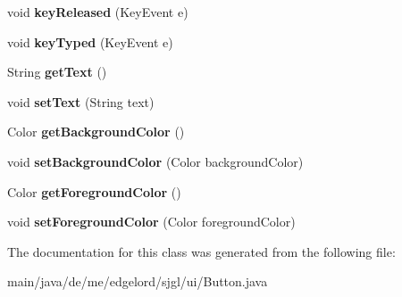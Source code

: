 \begin{DoxyCompactItemize}
void {\bfseries key\+Released} (Key\+Event e)
\item 
\mbox{\label{classde_1_1me_1_1edgelord_1_1sjgl_1_1ui_1_1_button_ac9965b45f8108c46ddbdcd4b589bb721}} 
void {\bfseries key\+Typed} (Key\+Event e)
\item 
\mbox{\label{classde_1_1me_1_1edgelord_1_1sjgl_1_1ui_1_1_button_a10a2c442e7f4094461adaa4562f98f4a}} 
String {\bfseries get\+Text} ()
\item 
\mbox{\label{classde_1_1me_1_1edgelord_1_1sjgl_1_1ui_1_1_button_ac6f97a139bb49795003a6f8e9e6f7339}} 
void {\bfseries set\+Text} (String text)
\item 
\mbox{\label{classde_1_1me_1_1edgelord_1_1sjgl_1_1ui_1_1_button_a5ba9974781cf8924054d457b68659f5a}} 
Color {\bfseries get\+Background\+Color} ()
\item 
\mbox{\label{classde_1_1me_1_1edgelord_1_1sjgl_1_1ui_1_1_button_a8d460ed5fb8c17ac91fddaf1aeb60042}} 
void {\bfseries set\+Background\+Color} (Color background\+Color)
\item 
\mbox{\label{classde_1_1me_1_1edgelord_1_1sjgl_1_1ui_1_1_button_a8aa9dbe9168ae185078fc819bb048d60}} 
Color {\bfseries get\+Foreground\+Color} ()
\item 
\mbox{\label{classde_1_1me_1_1edgelord_1_1sjgl_1_1ui_1_1_button_a5fdaaf208f7d6331dcbbbc180ef1413a}} 
void {\bfseries set\+Foreground\+Color} (Color foreground\+Color)
\end{DoxyCompactItemize}


The documentation for this class was generated from the following file\+:\begin{DoxyCompactItemize}
\item 
main/java/de/me/edgelord/sjgl/ui/Button.\+java\end{DoxyCompactItemize}
